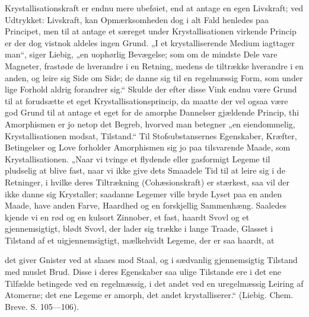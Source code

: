 \documentclass[12pt,a4paper]{book}
\begin{document}
Krystallisationskraft er endnu mere ubeføiet, end at antage en egen
Livskraft; ved Udtrykket: Livskraft, kan Opmærksomheden dog i alt Fald
henledes paa Principet, men til at antage et særeget under
Krystallisationen virkende Princip er der dog vistnok aldeles ingen
Grund. „I et krystalliserende Medium iagttager man“, siger Liebig, „en
uophørlig Bevægelse; som om de mindste Dele vare Magneter, frastøde de
hverandre i en Retning, medens de tiltrække hverandre i en anden, og
leire sig Side om Side; de danne sig til en regelmæssig Form, som under
lige Forhold aldrig forandrer sig.“ Skulde der efter disse Vink endnu
være Grund til at forudsætte et eget Krystallisationsprincip, da maatte
der vel ogsaa være god Grund til at antage et eget for de amorphe
Dannelser gjældende Princip, thi Amorphismen er jo netop det Begreb,
hvorved man betegner „en eiendommelig, Krystallisationen modsat,
Tilstand.“ Til Stofsubstansernes Egenskaber, Kræfter, Betingelser og
Love forholder Amorphismen sig jo paa tilsvarende Maade, som
Krystallisationen. „Naar vi tvinge et flydende eller gasformigt Legeme
til pludselig at blive fast, naar vi ikke give dets Smaadele Tid til at
leire sig i de Retninger, i hvilke deres Tiltrækning (Cohæsionskraft) er
stærkest, saa vil der ikke danne sig Krystaller; saadanne Legemer ville
bryde Lyset paa en anden Maade, have anden Farve, Haardhed og en
forskjellig Sammenhæng. Saaledes kjende vi en rød og en kulsort
Zinnober, et fast, haardt Svovl og et gjennemsigtigt, blødt Svovl, der
lader sig trække i lange Traade, Glasset i Tilstand af et
uigjennemsigtigt, mælkehvidt Legeme, der er saa haardt, at

\setcounter{footnote}{0}
det giver Gnister ved at slaaes mod Staal, og i sædvanlig gjennemsigtig
Tilstand med muslet Brud. Disse i deres Egenskaber saa ulige Tilstande
ere i det ene Tilfælde betingede ved en regelmæssig, i det andet ved en
uregelmæssig Leiring af Atomerne; det ene Legeme er amorph, det andet
krystalliserer.“ (Liebig. Chem. Breve. S. 105---106).
\end{document}
